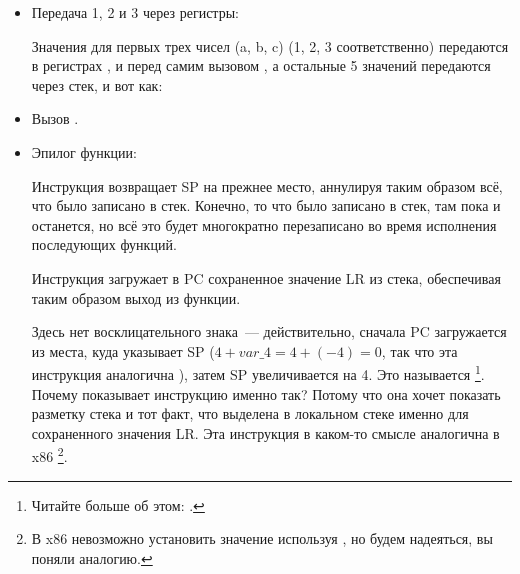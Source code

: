 \begin{itemize}
\item Передача 1, 2 и 3 через регистры:

Значения для первых трех чисел (a, b, c) (1, 2, 3 соответственно) передаются в регистрах 
,  и  перед самим вызовом \printf, а остальные 5 значений передаются через стек, и вот как:

\item Вызов \printf.

\item Эпилог функции:

Инструкция  возвращает \ac{SP} на прежнее место, 
аннулируя таким образом всё, что было записано в стек.
Конечно, то что было записано в стек, там пока и останется, но всё это будет многократно 
перезаписано во время исполнения последующих функций.

Инструкция  загружает в \ac{PC} 
сохраненное значение \ac{LR} из стека, обеспечивая таким образом выход из функции.

Здесь нет восклицательного знака~--- действительно, сначала \ac{PC} загружается из места, куда указывает \ac{SP}
($4+var\_4=4+(-4)=0$, так что эта инструкция аналогична ), затем \ac{SP} увеличивается 
на 4.
Это называется \footnote{Читайте больше об этом: .}.
Почему \IDA показывает инструкцию именно так?
Потому что она хочет показать разметку стека и тот факт, что  выделена в локальном стеке именно для сохраненного
значения \ac{LR}.
Эта инструкция в каком-то смысле аналогична  в x86
\footnote{В x86 невозможно установить значение  используя \POP, но будем надеяться, вы поняли аналогию.}.

\end{itemize}

\myparagraph{\OptimizingKeilVI: \ThumbMode}

